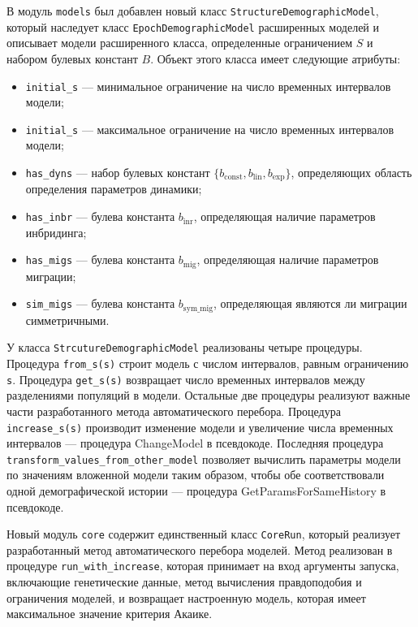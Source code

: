 В модуль \texttt{models} был добавлен новый класс  \linebreak \texttt{StructureDemographicModel}, который наследует класс \linebreak \texttt{EpochDemographicModel} расширенных моделей и описывает модели расширенного класса, определенные ограничением $S$ и набором булевых констант $B$.
Объект этого класса имеет следующие атрибуты:
\begin{itemize}
    \item \texttt{initial\_s} --- минимальное ограничение на число временных интервалов модели;
    \item \texttt{initial\_s} --- максимальное ограничение на число временных интервалов модели;
    \item \texttt{has\_dyns} --- набор булевых констант $\{b_\text{const}, b_\text{lin}, b_\text{exp}\}$, определяющих область определения параметров динамики;
    \item \texttt{has\_inbr} --- булева константа $b_\text{inr}$, определяющая наличие параметров инбридинга;
    \item \texttt{has\_migs} --- булева константа $b_\text{mig}$, определяющая наличие параметров миграции;
    \item \texttt{sim\_migs} --- булева константа $b_\text{sym\_mig}$, определяющая являются ли миграции симметричными.
\end{itemize}
У класса \texttt{StrcutureDemographicModel} реализованы четыре процедуры. Процедура \texttt{from\_s(s)} строит модель с числом интервалов, равным ограничению \texttt{s}.
Процедура \texttt{get\_s(s)} возвращает число временных интервалов между разделениями популяций в модели.
Остальные две процедуры реализуют важные части разработанного метода автоматического перебора.
Процедура \texttt{increase\_s(s)} производит изменение модели и увеличение числа временных интервалов --- процедура ChangeModel в псевдокоде.
Последняя процедура \texttt{transform\_values\_from\_other\_model} позволяет вычислить параметры модели по значениям вложенной модели таким образом, чтобы обе соответствовали одной демографической истории --- процедура GetParamsForSameHistory в псевдокоде.

Новый модуль \texttt{core} содержит единственный класс \texttt{CoreRun}, который реализует разработанный метод автоматического перебора моделей.
Метод реализован в процедуре \texttt{run\_with\_increase}, которая принимает на вход аргументы запуска, включающие генетические данные, метод вычисления правдоподобия и ограничения моделей, и возвращает настроенную модель, которая имеет максимальное значение критерия Акаике.

